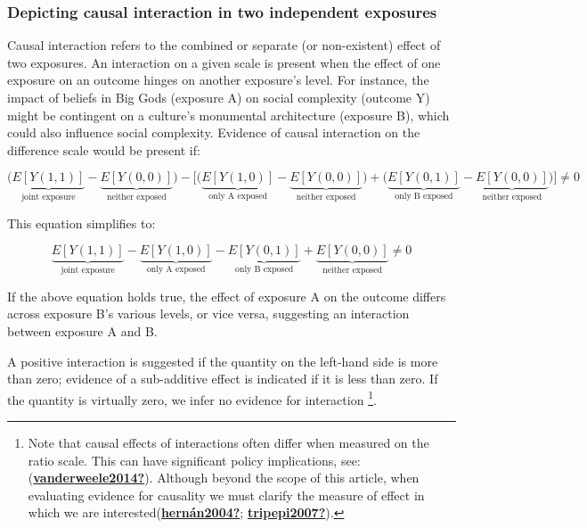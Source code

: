 \documentclass[
  singlecolumn]{report}
\begin{document}
\hypertarget{depicting-causal-interaction-in-two-independent-exposures}{%
\subsubsection{\texorpdfstring{\textbf{Depicting causal interaction in
two independent
exposures}}{Depicting causal interaction in two independent exposures}}\label{depicting-causal-interaction-in-two-independent-exposures}}

Causal interaction refers to the combined or separate (or non-existent)
effect of two exposures. An interaction on a given scale is present when
the effect of one exposure on an outcome hinges on another exposure's
level. For instance, the impact of beliefs in Big Gods (exposure A) on
social complexity (outcome Y) might be contingent on a culture's
monumental architecture (exposure B), which could also influence social
complexity. Evidence of causal interaction on the difference scale would
be present if:

\[\bigg(\underbrace{E[Y(1,1)]}_{\text{joint exposure}} - \underbrace{E[Y(0,0)]}_{\text{neither exposed}}\bigg) - \bigg[ \bigg(\underbrace{E[Y(1,0)]}_{\text{only A exposed}} - \underbrace{E[Y(0,0)]}_{\text{neither exposed}}\bigg) + \bigg(\underbrace{E[Y(0,1)]}_{\text{only B exposed}} - \underbrace{E[Y(0,0)]}_{\text{neither exposed}} \bigg)\bigg] \neq 0 \]

This equation simplifies to:

\[ \underbrace{E[Y(1,1)]}_{\text{joint exposure}} - \underbrace{E[Y(1,0)]}_{\text{only A exposed}} - \underbrace{E[Y(0,1)]}_{\text{only B exposed}} + \underbrace{E[Y(0,0)]}_{\text{neither exposed}} \neq 0 \]

If the above equation holds true, the effect of exposure A on the
outcome differs across exposure B's various levels, or vice versa,
suggesting an interaction between exposure A and B.

A positive interaction is suggested if the quantity on the left-hand
side is more than zero; evidence of a sub-additive effect is indicated
if it is less than zero. If the quantity is virtually zero, we infer no
evidence for interaction \footnote{Note that causal effects of
  interactions often differ when measured on the ratio scale. This can
  have significant policy implications, see:
  (\protect\hyperlink{ref-vanderweele2014}{\textbf{vanderweele2014?}}).
  Although beyond the scope of this article, when evaluating evidence
  for causality we must clarify the measure of effect in which we are
  interested(\protect\hyperlink{ref-hernuxe1n2004}{\textbf{hernán2004?}};
  \protect\hyperlink{ref-tripepi2007}{\textbf{tripepi2007?}}).}.
\end{document}
